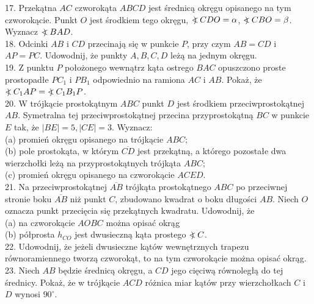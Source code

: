 \documentclass[10pt]{article}
\newcommand\Varangle{\mathop{{<\!\!\!\!\!\text{\small)}}\:}\nolimits}
\begin{document}
17. Przekątna \(A C\) czworokąta \(A B C D\) jest średnicą okręgu opisanego na tym czworokącie. Punkt \(O\) jest środkiem tego okręgu, \(\Varangle C D O=\alpha\), \(\Varangle C B O=\beta\). Wyznacz \(\Varangle B A D\).\\
18. Odcinki \(A B\) i \(C D\) przecinają się w punkcie \(P\), przy czym \(A B=C D\) i \(A P=P C\). Udowodnij, że punkty \(A, B, C, D\) leżą na jednym okręgu.\\
19. Z punktu \(P\) położonego wewnątrz kąta ostrego \(B A C\) opuszczono proste prostopadłe \(P C_{1}\) i \(P B_{1}\) odpowiednio na ramiona \(A C\) i \(A B\). Pokaż, że \(\Varangle C_{1} A P=\Varangle C_{1} B_{1} P\).\\
20. W trójkącie prostokątnym \(A B C\) punkt \(D\) jest środkiem przeciwprostokątnej \(A B\). Symetralna tej przeciwprostokątnej przecina przyprostokątną \(B C\) w punkcie \(E\) tak, że \(|B E|=5,|C E|=3\). Wyznacz:\\
(a) promień okręgu opisanego na trójkącie \(A B C\);\\
(b) pole prostokąta, w którym \(\overline{C D}\) jest przekątną, a którego pozostałe dwa wierzchołki leżą na przyprostokątnych trójkąta \(A B C\);\\
(c) promień okręgu opisanego na czworokącie \(A C E D\).\\
21. Na przeciwprostokątnej \(\overline{A B}\) trójkąta prostokątnego \(A B C\) po przeciwnej stronie boku \(\overline{A B}\) niż punkt \(C\), zbudowano kwadrat o boku długości \(A B\). Niech \(O\) oznacza punkt przecięcia się przekątnych kwadratu. Udowodnij, że\\
(a) na czworokącie \(A O B C\) można opisać okrąg\\
(b) półprosta \(h_{C O}\) jest dwusieczną kąta prostego \(\Varangle C\).\\
22. Udowodnij, że jeżeli dwusieczne kątów wewnętrznych trapezu równoramiennego tworzą czworokąt, to na tym czworokącie można opisać okrąg.\\
23. Niech \(A B\) będzie średnicą okręgu, a \(C D\) jego cięciwą równoległą do tej średnicy. Pokaż, że w trójkącie \(A C D\) różnica miar kątów przy wierzchołkach \(C\) i \(D\) wynosi \(90^{\circ}\).\\
\end{document}
